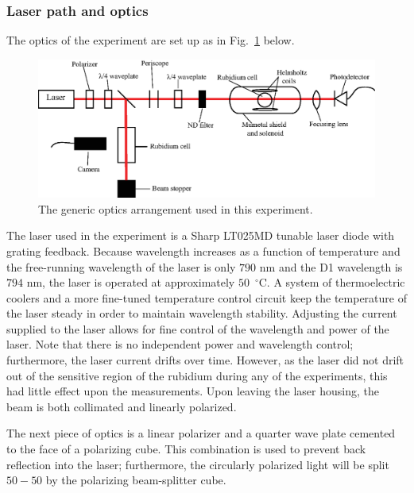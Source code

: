 \subsubsection{Laser path and optics}

The optics of the experiment are set up as in Fig.~\ref{fig:optics1} below.

\begin{figure}[htbp]
\begin{center}
\includegraphics[width=6.5in]{./figures/optics1.eps}
\caption{\small{The generic optics arrangement used in this experiment.}}
\label{fig:optics1}
\end{center}
\end{figure}


The laser used in the experiment is a Sharp LT025MD tunable laser diode with grating feedback. Because wavelength increases as a function of temperature and the free-running wavelength of the laser is only $790$ nm and the D1 wavelength is $794$ nm, the laser is operated at approximately $50$~$^{\circ}$C. A system of thermoelectric coolers and a more fine-tuned temperature control circuit keep the temperature of the laser steady in order to maintain wavelength stability. Adjusting the current supplied to the laser allows for fine control of the wavelength and power of the laser. Note that there is no independent power and wavelength control; furthermore, the laser current drifts over time. However, as the laser did not drift out of the sensitive region of the rubidium during any of the experiments, this had little effect upon the measurements. Upon leaving the laser housing, the beam is both collimated and linearly polarized.

The next piece of optics is a linear polarizer and a quarter wave plate cemented to the face of a polarizing cube. This combination is used to prevent back reflection into the laser; furthermore, the circularly polarized light will be split $50-50$ by the polarizing beam-splitter cube. 

